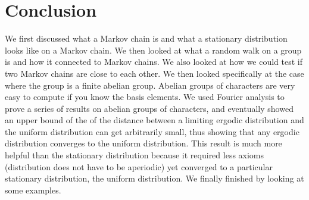 \documentclass[]{article}
\theoremstyle{definition}
\numberwithin{theorem}{section}
\numberwithin{equation}{section}
\begin{document}
\section{Conclusion}
We first discussed what a Markov chain is and what a stationary distribution looks like on a Markov chain. We then looked at what a random walk on a group is and how it connected to Markov chains. We also looked at how we could test if two Markov chains are close to each other. We then looked specifically at the case where the group is a finite abelian group. Abelian groups of characters are very easy to compute if you know the basis elements. We used Fourier analysis to prove a series of results on abelian groups of characters, and eventually showed an upper bound of the of the distance between a limiting ergodic distribution and the uniform distribution can get arbitrarily small, thus showing that any ergodic distribution converges to the uniform distribution. This result is much more helpful than the stationary distribution because it required less axioms (distribution does not have to be aperiodic) yet converged to a particular stationary distribution, the uniform distribution. We finally finished by looking at some examples. 

\printbibliography
\end{document}
